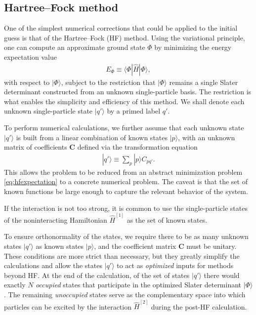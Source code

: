 \subsection{Hartree--Fock method}
\label{subsec:HartreeFockmethod}

One of the simplest numerical corrections that could be applied to the initial guess is that of the Hartree--Fock (HF) method.  Using the variational principle, one can compute an approximate ground state $\Phi$ by minimizing the energy expectation value
\begin{align} \label{eq:hfexpectation}
  E_{\Phi} \equiv \langle \Phi | \hat H | \Phi \rangle,
\end{align}
with respect to $|\Phi\rangle$, subject to the restriction that $|\Phi\rangle$ remains a single Slater determinant constructed from an unknown single-particle basis.  The restriction is what enables the simplicity and efficiency of this method.  We shall denote each unknown single-particle state $|q'\rangle$ by a primed label $q'$.

To perform numerical calculations, we further assume that each unknown state $|q'\rangle$ is built from a linear combination of known states $|p\rangle$, with an unknown matrix of coefficients $\bm C$ defined via the transformation equation
\begin{align*}
  |q'\rangle \equiv \sum_p |p\rangle C_{p q'}.
\end{align*}
This allows the problem to be reduced from an abstract minimization problem \eqref{eq:hfexpectation} to a concrete numerical problem.  The caveat is that the set of known functions be large enough to capture the relevant behavior of the system.

If the interaction is not too strong, it is common to use the single-particle states of the noninteracting Hamiltonian $\hat{H}^{[1]}$ as the set of known states.

To ensure orthonormality of the states, we require there to be as many unknown states $|q'\rangle$ as known states $|p\rangle$, and the coefficient matrix $\bm C$ must be unitary.  These conditions are more strict than necessary, but they greatly simplify the calculations and allow the states $|q'\rangle$ to act as \textit{optimized} inputs for methods beyond HF.  At the end of the calculation, of the set of states $|q'\rangle$ there would exactly $N$ \textit{occupied} states that participate in the optimized Slater determinant $|\Phi\rangle$.  The remaining \textit{unoccupied} states serve as the complementary space into which particles can be excited by the interaction $\hat{H}^{[2]}$ during the post-HF calculation.

